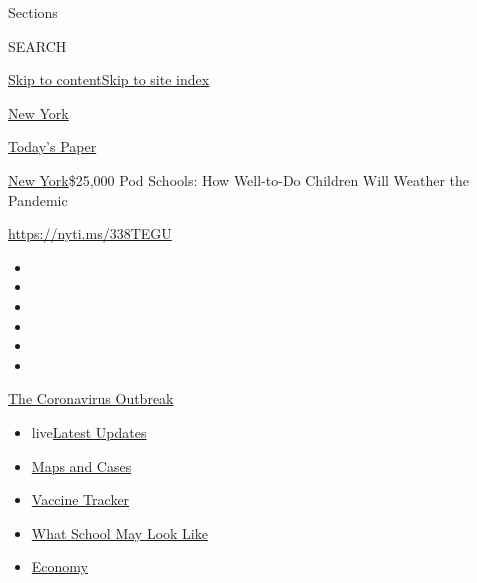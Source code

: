 Sections

SEARCH

\protect\hyperlink{site-content}{Skip to
content}\protect\hyperlink{site-index}{Skip to site index}

\href{https://www.nytimes.com/section/nyregion}{New York}

\href{https://myaccount.nytimes.com/auth/login?response_type=cookie\&client_id=vi}{}

\href{https://www.nytimes.com/section/todayspaper}{Today's Paper}

\href{/section/nyregion}{New York}\textbar{}\$25,000 Pod Schools: How
Well-to-Do Children Will Weather the Pandemic

\url{https://nyti.ms/338TEGU}

\begin{itemize}
\item
\item
\item
\item
\item
\item
\end{itemize}

\href{https://www.nytimes.com/news-event/coronavirus?action=click\&pgtype=Article\&state=default\&region=TOP_BANNER\&context=storylines_menu}{The
Coronavirus Outbreak}

\begin{itemize}
\tightlist
\item
  live\href{https://www.nytimes.com/2020/08/01/world/coronavirus-covid-19.html?action=click\&pgtype=Article\&state=default\&region=TOP_BANNER\&context=storylines_menu}{Latest
  Updates}
\item
  \href{https://www.nytimes.com/interactive/2020/us/coronavirus-us-cases.html?action=click\&pgtype=Article\&state=default\&region=TOP_BANNER\&context=storylines_menu}{Maps
  and Cases}
\item
  \href{https://www.nytimes.com/interactive/2020/science/coronavirus-vaccine-tracker.html?action=click\&pgtype=Article\&state=default\&region=TOP_BANNER\&context=storylines_menu}{Vaccine
  Tracker}
\item
  \href{https://www.nytimes.com/interactive/2020/07/29/us/schools-reopening-coronavirus.html?action=click\&pgtype=Article\&state=default\&region=TOP_BANNER\&context=storylines_menu}{What
  School May Look Like}
\item
  \href{https://www.nytimes.com/live/2020/07/31/business/stock-market-today-coronavirus?action=click\&pgtype=Article\&state=default\&region=TOP_BANNER\&context=storylines_menu}{Economy}
\end{itemize}

